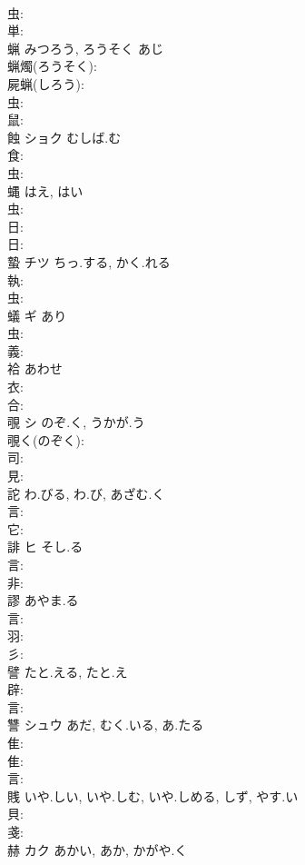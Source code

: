 \documentclass[8pt]{extreport}
\begin{document}
\begin{CJK}{UTF8}{min}
\\	虫: 
\\	単: 
\\	蝋		みつろう, ろうそく	あじ		
\\	蝋燭(ろうそく): 
\\	屍蝋(しろう): 
\\	虫: 
\\	鼠: 
\\	蝕	ショク	むしば.む		
\\	食: 
\\	虫: 
\\	蝿		はえ, はい			
\\	虫: 
\\	日: 
\\	日: 
\\	蟄	チツ	ちっ.する, かく.れる		
\\	執: 
\\	虫: 
\\	蟻	ギ	あり		
\\	虫: 
\\	義: 
\\	袷		あわせ			
\\	衣: 
\\	合: 
\\	覗	シ	のぞ.く, うかが.う		
\\	覗く(のぞく): 
\\	司: 
\\	見: 
\\	詑		わ.びる, わ.び, あざむ.く			
\\	言: 
\\	它: 
\\	誹	ヒ	そし.る		
\\	言: 
\\	非: 
\\	謬		あやま.る			
\\	言: 
\\	羽: 
\\	彡: 
\\	譬		たと.える, たと.え			
\\	辟: 
\\	言: 
\\	讐	シュウ	あだ, むく.いる, あ.たる		
\\	隹: 
\\	隹: 
\\	言: 
\\	賎		いや.しい, いや.しむ, いや.しめる, しず, やす.い			
\\	貝: 
\\	戔: 
\\	赫	カク	あかい, あか, かがや.く		

\end{CJK}
\end{document}
